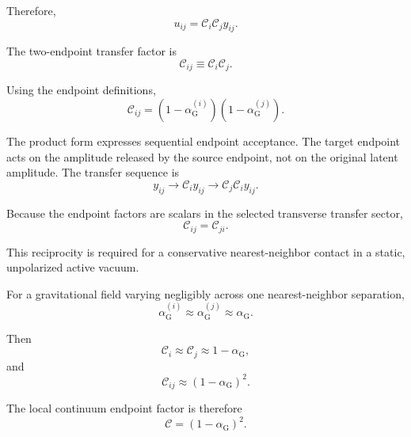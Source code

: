 Therefore,
\begin{equation}
    u_{ij} = \mathcal{C}_i\mathcal{C}_j y_{ij}.
\end{equation}

The two-endpoint transfer factor is
\begin{equation}
    \mathcal{C}_{ij} \equiv \mathcal{C}_i\mathcal{C}_j.
\end{equation}

Using the endpoint definitions,
\begin{equation}
    \boxed{ \mathcal{C}_{ij} = \left( 1-\alpha_{\mathrm{G}}^{(i)} \right) \left( 1-\alpha_{\mathrm{G}}^{(j)} \right) }.
\end{equation}

The product form expresses sequential endpoint acceptance. The target endpoint acts on the amplitude released by the source endpoint, not on the original latent amplitude. The transfer sequence is
\begin{equation}
    y_{ij} \longrightarrow \mathcal{C}_i y_{ij} \longrightarrow \mathcal{C}_j\mathcal{C}_i y_{ij}.
\end{equation}

Because the endpoint factors are scalars in the selected transverse transfer sector,
\begin{equation}
    \mathcal{C}_{ij} = \mathcal{C}_{ji}.
\end{equation}

This reciprocity is required for a conservative nearest-neighbor contact in a static, unpolarized active vacuum.

For a gravitational field varying negligibly across one nearest-neighbor separation,
\begin{equation}
    \alpha_{\mathrm{G}}^{(i)} \approx \alpha_{\mathrm{G}}^{(j)} \approx \alpha_{\mathrm{G}}.
\end{equation}

Then
\begin{equation}
    \mathcal{C}_i \approx \mathcal{C}_j \approx 1-\alpha_{\mathrm{G}},
\end{equation}
and
\begin{equation}
    \mathcal{C}_{ij} \approx (1-\alpha_{\mathrm{G}})^2.
\end{equation}

The local continuum endpoint factor is therefore
\begin{equation}
    \mathcal{C} = (1-\alpha_{\mathrm{G}})^2.
\end{equation}

